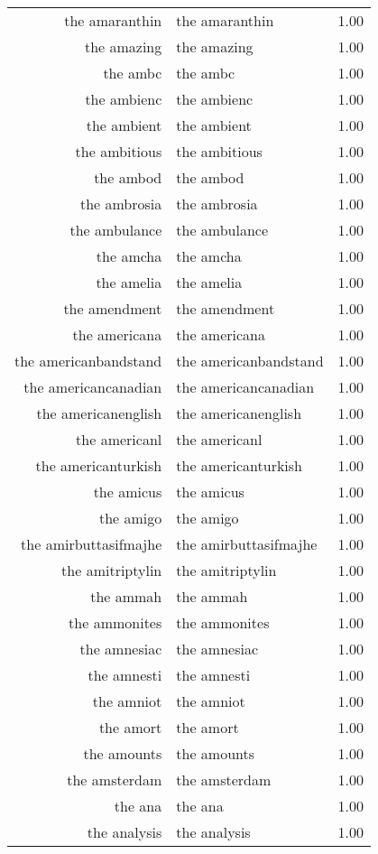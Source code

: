 \begin{table}[ht]
\begin{tabular}{rlr}
  the amaranthin & the amaranthin & 1.00 \\ 
  the amazing & the amazing & 1.00 \\ 
  the ambc & the ambc & 1.00 \\ 
  the ambienc & the ambienc & 1.00 \\ 
  the ambient & the ambient & 1.00 \\ 
  the ambitious & the ambitious & 1.00 \\ 
  the ambod & the ambod & 1.00 \\ 
  the ambrosia & the ambrosia & 1.00 \\ 
  the ambulance & the ambulance & 1.00 \\ 
  the amcha & the amcha & 1.00 \\ 
  the amelia & the amelia & 1.00 \\ 
  the amendment & the amendment & 1.00 \\ 
  the americana & the americana & 1.00 \\ 
  the americanbandstand & the americanbandstand & 1.00 \\ 
  the americancanadian & the americancanadian & 1.00 \\ 
  the americanenglish & the americanenglish & 1.00 \\ 
  the americanl & the americanl & 1.00 \\ 
  the americanturkish & the americanturkish & 1.00 \\ 
  the amicus & the amicus & 1.00 \\ 
  the amigo & the amigo & 1.00 \\ 
  the amirbuttasifmajhe & the amirbuttasifmajhe & 1.00 \\ 
  the amitriptylin & the amitriptylin & 1.00 \\ 
  the ammah & the ammah & 1.00 \\ 
  the ammonites & the ammonites & 1.00 \\ 
  the amnesiac & the amnesiac & 1.00 \\ 
  the amnesti & the amnesti & 1.00 \\ 
  the amniot & the amniot & 1.00 \\ 
  the amort & the amort & 1.00 \\ 
  the amounts & the amounts & 1.00 \\ 
  the amsterdam & the amsterdam & 1.00 \\ 
  the ana & the ana & 1.00 \\ 
  the analysis & the analysis & 1.00 \\ 

\end{tabular}
\end{table}
